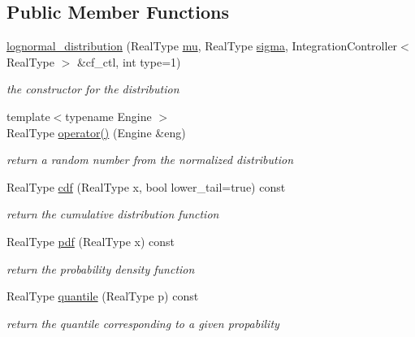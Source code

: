 \subsection*{Public Member Functions}
\begin{DoxyCompactItemize}
\item 
\mbox{\hyperlink{structlognormal__distribution_a904d491e75ef65ec8bc8373ab40f4dda}{lognormal\+\_\+distribution}} (Real\+Type \mbox{\hyperlink{structlognormal__distribution_aafbea1099645b17baf5a6789e9a17615}{mu}}, Real\+Type \mbox{\hyperlink{structlognormal__distribution_a07a77c8819313d92d38a275ba1c94b55}{sigma}}, Integration\+Controller$<$ Real\+Type $>$ \&cf\+\_\+ctl, int type=1)
\begin{DoxyCompactList}\small\item\em the constructor for the distribution \end{DoxyCompactList}\item 
\mbox{\label{structlognormal__distribution_ad8a1fe52287436f6abd5ce60d91bad2c}} 
{\footnotesize template$<$typename Engine $>$ }\\Real\+Type \mbox{\hyperlink{structlognormal__distribution_ad8a1fe52287436f6abd5ce60d91bad2c}{operator()}} (Engine \&eng)
\begin{DoxyCompactList}\small\item\em return a random number from the normalized distribution \end{DoxyCompactList}\item 
Real\+Type \mbox{\hyperlink{structlognormal__distribution_a70784d5a2f900ab772c106e6990f176a}{cdf}} (Real\+Type x, bool lower\+\_\+tail=true) const
\begin{DoxyCompactList}\small\item\em return the cumulative distribution function \end{DoxyCompactList}\item 
Real\+Type \mbox{\hyperlink{structlognormal__distribution_a0bf3bc670b041d5015d9a4a88d6220a4}{pdf}} (Real\+Type x) const
\begin{DoxyCompactList}\small\item\em return the probability density function \end{DoxyCompactList}\item 
Real\+Type \mbox{\hyperlink{structlognormal__distribution_ae4e4b312d8225523a204f7e12615b8a2}{quantile}} (Real\+Type p) const
\begin{DoxyCompactList}\small\item\em return the quantile corresponding to a given propability \end{DoxyCompactList}\item 

\end{DoxyCompactItemize}
